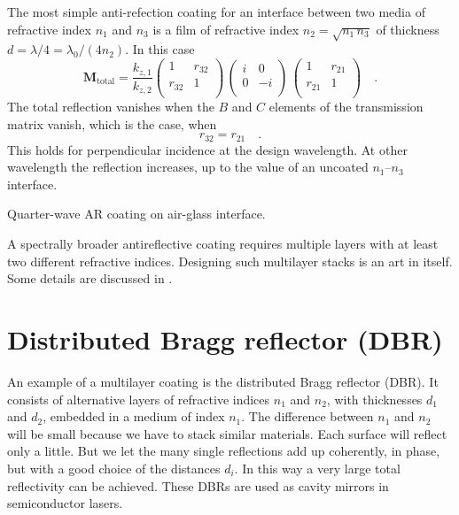The most simple anti-refection coating for an interface between two media of refractive index $n_1$ and $n_3$ is a film of refractive index $n_2 = \sqrt{n_1 \, n_3}$ of thickness $d = \lambda / 4 = \lambda_0 / (4 n_2)$. In this case
\begin{equation}
  \mathbf{M}_\text{total}
  = 
  \frac{k_{z,1}}{k_{z,2}} 
  \begin{pmatrix}
  1 & r_{32} \\ r_{32} & 1 \\
  \end{pmatrix} 
\, 
\begin{pmatrix}
  i & 0 \\0 & -i \\
  \end{pmatrix}
\,
\begin{pmatrix}
1 & r_{21} \\ r_{21} & 1 \\
\end{pmatrix}  \quad . 
\end{equation}
The total reflection vanishes when the $B$ and $C$ elements of the transmission matrix vanish, which is the case, when
\begin{equation}
  r_{32} = r_{21} \quad .
\end{equation}
This holds for perpendicular incidence at the design wavelength. At other wavelength the reflection increases, up to the value of an uncoated $n_1$--$n_3$ interface.

\begin{marginfigure}
  \caption{Quarter-wave AR coating on air-glass interface.}
\end{marginfigure}


A spectrally broader antireflective coating requires multiple layers with at least two different refractive indices. Designing such multilayer stacks is an art in itself. Some details are discussed in \cite{Melles_griot_filter}.



\section{Distributed Bragg reflector (DBR) }

An example of a multilayer coating is the distributed Bragg reflector (DBR).  It consists of alternative layers of refractive indices $n_1$ and $n_2$, with thicknesses $d_1$ and $d_2$, embedded in a medium of index $n_1$. The difference between $n_1$ and $n_2$ will be small because we have to stack similar materials. Each surface will reflect only a little. But we let the many single reflections add up coherently, in phase, but with a good choice of the distances $d_i$. In this way a very large total reflectivity can be achieved. These DBRs are used as cavity mirrors in semiconductor lasers.

